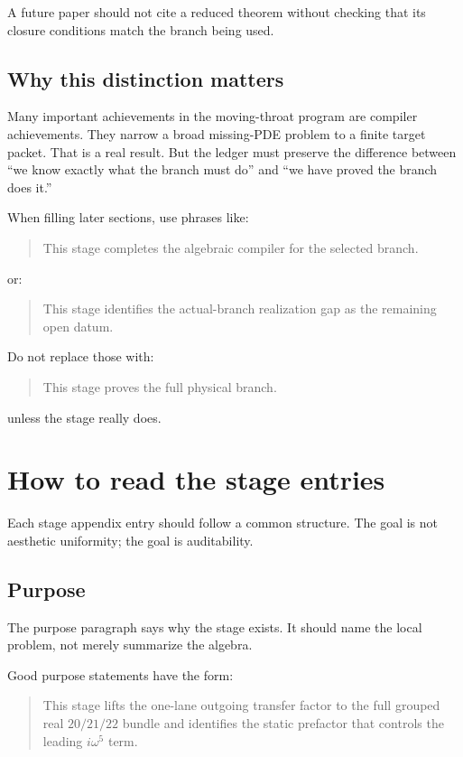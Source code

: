 A future paper should not cite a reduced theorem without checking that its closure conditions match the branch being used.

\subsection{Why this distinction matters}
\label{subsec:why-compiler-realization-matters}

Many important achievements in the moving-throat program are compiler achievements.  They narrow a broad missing-PDE problem to a finite target packet.  That is a real result.  But the ledger must preserve the difference between ``we know exactly what the branch must do'' and ``we have proved the branch does it.''

When filling later sections, use phrases like:
\begin{quote}
This stage completes the algebraic compiler for the selected branch.
\end{quote}

or:
\begin{quote}
This stage identifies the actual-branch realization gap as the remaining open datum.
\end{quote}

Do not replace those with:
\begin{quote}
This stage proves the full physical branch.
\end{quote}

unless the stage really does.

\section{How to read the stage entries}
\label{sec:how-to-read-stage-entries}

Each stage appendix entry should follow a common structure.  The goal is not aesthetic uniformity; the goal is auditability.

\subsection{Purpose}
\label{subsec:stage-purpose}

The purpose paragraph says why the stage exists.  It should name the local problem, not merely summarize the algebra.

Good purpose statements have the form:
\begin{quote}
This stage lifts the one-lane outgoing transfer factor to the full grouped real \(20/21/22\) bundle and identifies the static prefactor that controls the leading \(i\omega^5\) term.
\end{quote}

